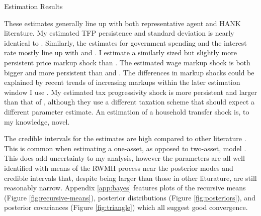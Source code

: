 \begin{table}[t]
    \centering
    \caption{Estimation Results}
    
    \label{tab:esti}
\end{table}

These estimates generally line up with both representative agent and HANK literature. My estimated TFP persistence and standard deviation is nearly identical to \textcite{bayer2024shocks}. Similarly, the estimates for government spending and the interest rate mostly line up with \textcite{bayer2024shocks} and \textcite{smets2007shocks}. I estimate a similarly sized but slightly more persistent price markup shock than \textcite{bayer2024shocks}. The estimated wage markup shock is both bigger and more persistent than \textcite{smets2007shocks} and \textcite{bayer2024shocks}. The differences in markup shocks could be explained by recent trends of increasing markups within the later estimation window I use \autocite{de2020rise}. My estimated tax progressivity shock is more persistent and larger than that of \textcite{bayer2024shocks}, although they use a different taxation scheme that should expect a different parameter estimate. An estimation of a household transfer shock is, to my knowledge, novel.

The credible intervals for the estimates are high compared to other literature \autocites{smets2007shocks}{bayer2024shocks}. This is common when estimating a one-asset, as opposed to two-asset, model \autocite{auclert2021using}. This does add uncertainty to my analysis, however the parameters are all well identified with means of the RWMH process near the posterior modes and credible intervals that, despite being larger than those in other liturature, are still reasonably narrow. Appendix \ref{app:bayes} features plots of the recursive means (Figure \ref{fig:recursive-means}), posterior distributions (Figure \ref{fig:posteriors}), and posterior covariances (Figure \ref{fig:triangle}) which all suggest good convergence.
